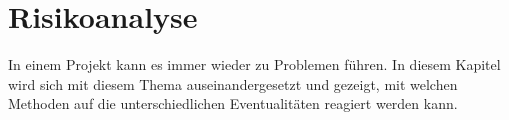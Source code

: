 \section{Risikoanalyse}
In einem Projekt kann es immer wieder zu Problemen führen. In diesem Kapitel wird sich mit diesem Thema auseinandergesetzt und gezeigt, mit welchen Methoden auf die unterschiedlichen Eventualitäten reagiert werden kann.